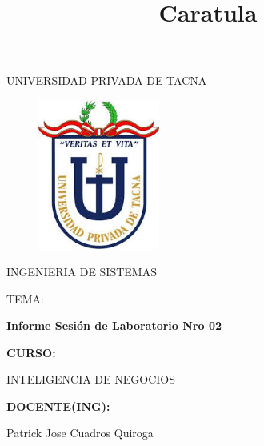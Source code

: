 \documentclass[preprint,12pt]{elsarticle}
\begin{document}
\title{Caratula}

\begin{titlepage}
\begin{center}
\large{UNIVERSIDAD PRIVADA DE TACNA}\\
\vspace*{-0.025in}
\begin{figure}[htb]
\begin{center}
\includegraphics[width=4cm]{./IMAGENES/logo.jpg}
\end{center}
\end{figure}
\vspace*{0.15in}
INGENIERIA DE SISTEMAS  \\

\vspace*{0.5in}
\begin{large}
TEMA:\\
\end{large}

\vspace*{0.1in}
\begin{Large}
\textbf{Informe Sesión de Laboratorio Nro 02} \\
\end{Large}

\vspace*{0.3in}
\begin{Large}
\textbf{CURSO:} \\
\end{Large}

\vspace*{0.1in}
\begin{large}
INTELIGENCIA DE NEGOCIOS\\
\end{large}

\vspace*{0.3in}
\begin{Large}
\textbf{DOCENTE(ING):} \\
\end{Large}

\vspace*{0.1in}
\begin{large}
 Patrick Jose Cuadros Quiroga\\
\end{large}


\end{center}
\end{titlepage}
\end{document}
